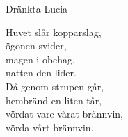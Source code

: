 \begin{song}{Dränkta Lucia}
	
	
	
	Huvet slår kopparslag,\\
	ögonen svider,\\
	magen i obehag,\\
	natten den lider.\\
	Då genom strupen går,\\
	hembränd en liten tår,\\
	vördat vare vårat brännvin,\\
	vörda vårt brännvin.
	
\end{song}
